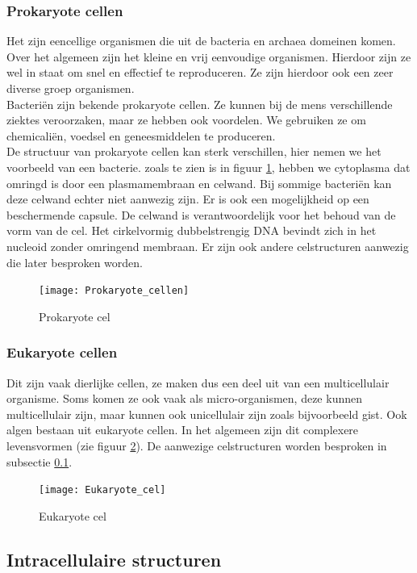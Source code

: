 \documentclass[a4paper,kul]{kulakarticle} %
\begin{document}
\subsubsection{Prokaryote cellen}
Het zijn eencellige organismen die uit de bacteria en archaea domeinen komen. Over het algemeen zijn het kleine en vrij eenvoudige organismen. Hierdoor zijn ze wel in staat om snel en effectief te reproduceren. Ze zijn hierdoor ook een zeer diverse groep organismen. 
\\
Bacteriën zijn bekende prokaryote cellen. Ze kunnen bij de mens verschillende ziektes veroorzaken, maar ze hebben ook voordelen. We gebruiken ze om chemicaliën, voedsel en geneesmiddelen te produceren. 
\\
De structuur van prokaryote cellen kan sterk verschillen, hier nemen we het voorbeeld van een bacterie. zoals te zien is in figuur \ref{fig:prokaryotecellen}, hebben we cytoplasma dat omringd is door een plasmamembraan en celwand. Bij sommige bacteriën kan deze celwand echter niet aanwezig zijn. Er is ook een mogelijkheid op een beschermende capsule. De celwand is verantwoordelijk voor het behoud van de vorm van de cel. Het cirkelvormig dubbelstrengig DNA bevindt zich in het nucleoid zonder omringend membraan. Er zijn ook andere celstructuren aanwezig die later besproken worden.
 

\begin{figure}[h]
	\centering
	\texttt{[image: Prokaryote\_cellen]}
	\caption[Prokaryote cel]{Prokaryote cel}
	\label{fig:prokaryotecellen}
\end{figure}
\newpage
\subsubsection{Eukaryote cellen}
Dit zijn vaak dierlijke cellen, ze maken dus een deel uit van een multicellulair organisme. Soms komen ze ook vaak als micro-organismen, deze kunnen multicellulair zijn, maar kunnen ook unicellulair zijn zoals bijvoorbeeld gist. Ook algen bestaan uit eukaryote cellen. In het algemeen zijn dit complexere levensvormen (zie figuur \ref{fig:eukaryotecel}). De aanwezige celstructuren worden besproken in subsectie \ref{sec:IntracellulaireStructuren}. 
\begin{figure}[h]
	\centering
	\texttt{[image: Eukaryote\_cel]}
	\caption[Eukaryote cel]{Eukaryote cel}
	\label{fig:eukaryotecel}
\end{figure}

\subsection{Intracellulaire structuren}
\label{sec:IntracellulaireStructuren}
\end{document}
